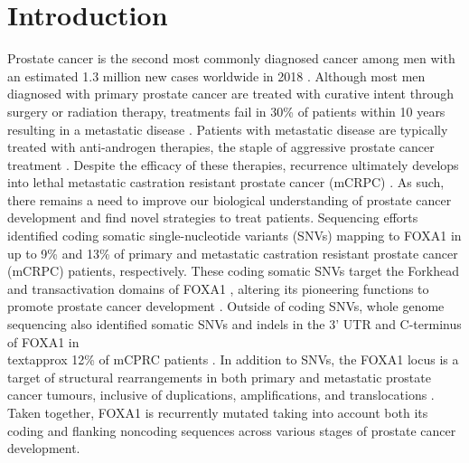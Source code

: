 \section{Introduction}

Prostate cancer is the second most commonly diagnosed cancer among men with an estimated 1.3 million new cases worldwide in 2018 \cite{brayGlobalCancerStatistics2018}.
Although most men diagnosed with primary prostate cancer are treated with curative intent through surgery or radiation therapy, treatments fail in 30\% of patients within 10 years \cite{boorjianLongTermOutcomeRadical2007} resulting in a metastatic disease \cite{litwinDiagnosisTreatmentProstate2017}.
Patients with metastatic disease are typically treated with anti-androgen therapies, the staple of aggressive prostate cancer treatment \cite{attardProstateCancer2016}.
Despite the efficacy of these therapies, recurrence ultimately develops into lethal metastatic castration resistant prostate cancer (mCRPC) \cite{attardProstateCancer2016}.
As such, there remains a need to improve our biological understanding of prostate cancer development and find novel strategies to treat patients.
Sequencing efforts identified coding somatic single-nucleotide variants (SNVs) mapping to FOXA1 in up to 9\% \cite{abeshouseMolecularTaxonomyPrimary2015,fraserGenomicHallmarksLocalized2017,barbieriExomeSequencingIdentifies2012, grassoMutationalLandscapeLethal2012,paroliaDistinctStructuralClasses2019,adamsFOXA1MutationsAlter2019} and 13\% \cite{paroliaDistinctStructuralClasses2019,adamsFOXA1MutationsAlter2019,robinsonIntegrativeClinicalGenomics2015} of primary and metastatic castration resistant prostate cancer (mCRPC) patients, respectively.
These coding somatic SNVs target the Forkhead and transactivation domains of FOXA1 \cite{robinsonFOXA1MutationsHormonedependent2013}, altering its pioneering functions to promote prostate cancer development \cite{adamsFOXA1MutationsAlter2019,gaoForkheadDomainMutations2019}.
Outside of coding SNVs, whole genome sequencing also identified somatic SNVs and indels in the 3' UTR and C-terminus of FOXA1 in \\textapprox 12\% of mCPRC patients \cite{annalaFrequentMutationFOXA12018}.
In addition to SNVs, the FOXA1 locus is a target of structural rearrangements in both primary and metastatic prostate cancer tumours, inclusive of duplications, amplifications, and translocations \cite{paroliaDistinctStructuralClasses2019,adamsFOXA1MutationsAlter2019}.
Taken together, FOXA1 is recurrently mutated taking into account both its coding and flanking noncoding sequences across various stages of prostate cancer development.

